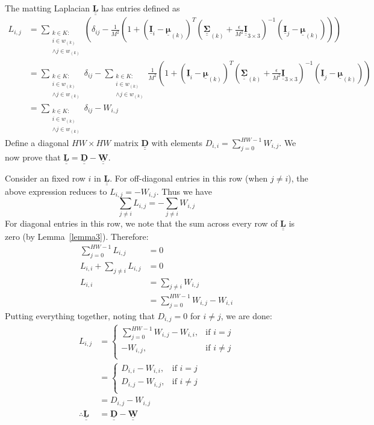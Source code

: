 \documentclass{article}
\theoremstyle{definition}
\def\vt#1{\underline{\mathbf{#1}}}
\def\vts#1{\underline{\boldsymbol{#1}}}
\def\mt#1{\underline{\underline{\mathbf{#1}}}}
\def\mts#1{\underline{\underline{\boldsymbol{#1}}}}
\begin{document}
The matting Laplacian $\mt L$ has entries defined as
\begin{align*}
    L_{i,j} &= \sum_{\substack{k\in K:\\i\in w_{(k)}\\ \wedge j\in w_{(k)}}} \left( \delta_{ij} - \frac1{M^2}\left(1 + \left(\vt{I}_i - \vts \mu_{(k)}\right)^T \left(\mts \Sigma_{(k)} + \frac\epsilon{M^2} \mt{I}_{3\times 3}\right)^{-1} \left(\vt{I}_j - \vts
\mu_{(k)}\right) \right) \right) \\
    &= \sum_{\substack{k\in K:\\i\in w_{(k)}\\ \wedge j\in w_{(k)}}} \delta_{ij} - \sum_{\substack{k\in K:\\i\in w_{(k)} \\\wedge j\in w_{(k)}}} \frac1{M^2} \left(1 + \left(\vt{I}_i - \vts \mu_{(k)}\right)^T \left(\mts \Sigma_{(k)} + \frac\epsilon{M^2} \mt{I}_{3\times 3}\right)^{-1} \left(\vt{I}_j - \vts
    \mu_{(k)}\right) \right) \\
    &= \sum_{\substack{k\in K:\\i\in w_{(k)} \\\wedge j\in w_{(k)}}} \delta_{ij} -  W_{i,j}
\end{align*}
Define a diagonal $HW\times HW$ matrix $\mt D$ with elements $D_{i,i} = \sum_{j=0}^{HW-1} W_{i,j}$. We now prove that $\mt L = \mt D - \mt W$.

Consider an fixed row $i$ in $\mt L$. For off-diagonal entries in this row (when $j\neq i$), the above expression reduces to $L_{i,j} = -W_{i,j}$. Thus we have
$$\sum_{j\neq i} L_{i,j} = -\sum_{j\neq i} W_{i,j}$$
For diagonal entries in this row, we note that the sum across every row of $\mt L$ is zero (by Lemma~\ref{lemma3}). Therefore:
\begin{align*}
    \sum_{j=0}^{HW-1} L_{i,j} &= 0\\
    L_{i,i} + \sum_{j\neq i} L_{i,j} &= 0\\
    L_{i,i} &= \sum_{j\neq i} W_{i,j}\\
    &= \sum_{j=0}^{HW-1} W_{i,j} - W_{i,i}
\end{align*}
Putting everything together, noting that $D_{i,j}=0$ for $i\neq j$, we are done:
\begin{align*}
    L_{i,j} &= \begin{cases}
        \sum_{j=0}^{HW-1} W_{i,j} - W_{i,i},&\text{if $i=j$}\\
        - W_{i,j},&\text{if $i\neq j$}\\
    \end{cases} \\
    &= \begin{cases}
        D_{i,i} - W_{i,i},&\text{if $i=j$}\\
        D_{i,j} - W_{i,j},&\text{if $i\neq j$}\\
    \end{cases}\\
    &= D_{i,j} - W_{i,j}\\
    \therefore \mt L &= \mt D - \mt W
\end{align*}
\end{document}
